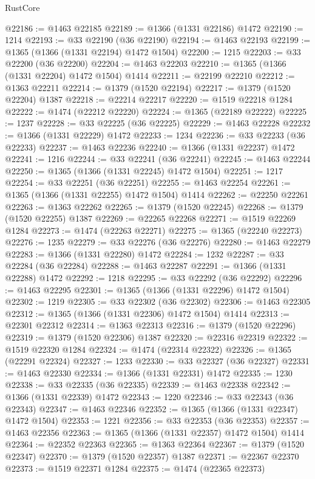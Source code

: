 \begin{lexlean}{RustCore}
\begin{coremodule}
@22186 := @1463 @22185
@22189 := @1366 (@1331 @22186) @1472
@22190 := 1214
@22193 := @33 @22190 (@36 @22190)
@22194 := @1463 @22193
@22199 := @1365 (@1366 (@1331 @22194) @1472 @1504)
@22200 := 1215
@22203 := @33 @22200 (@36 @22200)
@22204 := @1463 @22203
@22210 := @1365 (@1366 (@1331 @22204) @1472 @1504) @1414
@22211 := @22199 @22210
@22212 := @1363 @22211
@22214 := @1379 (@1520 @22194)
@22217 := @1379 (@1520 @22204) @1387
@22218 := @22214 @22217
@22220 := @1519 @22218 @1284
@22222 := @1474 (@22212 @22220)
@22224 := @1365 (@22189 @22222)
@22225 := 1237
@22228 := @33 @22225 (@36 @22225)
@22229 := @1463 @22228
@22232 := @1366 (@1331 @22229) @1472
@22233 := 1234
@22236 := @33 @22233 (@36 @22233)
@22237 := @1463 @22236
@22240 := @1366 (@1331 @22237) @1472
@22241 := 1216
@22244 := @33 @22241 (@36 @22241)
@22245 := @1463 @22244
@22250 := @1365 (@1366 (@1331 @22245) @1472 @1504)
@22251 := 1217
@22254 := @33 @22251 (@36 @22251)
@22255 := @1463 @22254
@22261 := @1365 (@1366 (@1331 @22255) @1472 @1504) @1414
@22262 := @22250 @22261
@22263 := @1363 @22262
@22265 := @1379 (@1520 @22245)
@22268 := @1379 (@1520 @22255) @1387
@22269 := @22265 @22268
@22271 := @1519 @22269 @1284
@22273 := @1474 (@22263 @22271)
@22275 := @1365 (@22240 @22273)
@22276 := 1235
@22279 := @33 @22276 (@36 @22276)
@22280 := @1463 @22279
@22283 := @1366 (@1331 @22280) @1472
@22284 := 1232
@22287 := @33 @22284 (@36 @22284)
@22288 := @1463 @22287
@22291 := @1366 (@1331 @22288) @1472
@22292 := 1218
@22295 := @33 @22292 (@36 @22292)
@22296 := @1463 @22295
@22301 := @1365 (@1366 (@1331 @22296) @1472 @1504)
@22302 := 1219
@22305 := @33 @22302 (@36 @22302)
@22306 := @1463 @22305
@22312 := @1365 (@1366 (@1331 @22306) @1472 @1504) @1414
@22313 := @22301 @22312
@22314 := @1363 @22313
@22316 := @1379 (@1520 @22296)
@22319 := @1379 (@1520 @22306) @1387
@22320 := @22316 @22319
@22322 := @1519 @22320 @1284
@22324 := @1474 (@22314 @22322)
@22326 := @1365 (@22291 @22324)
@22327 := 1233
@22330 := @33 @22327 (@36 @22327)
@22331 := @1463 @22330
@22334 := @1366 (@1331 @22331) @1472
@22335 := 1230
@22338 := @33 @22335 (@36 @22335)
@22339 := @1463 @22338
@22342 := @1366 (@1331 @22339) @1472
@22343 := 1220
@22346 := @33 @22343 (@36 @22343)
@22347 := @1463 @22346
@22352 := @1365 (@1366 (@1331 @22347) @1472 @1504)
@22353 := 1221
@22356 := @33 @22353 (@36 @22353)
@22357 := @1463 @22356
@22363 := @1365 (@1366 (@1331 @22357) @1472 @1504) @1414
@22364 := @22352 @22363
@22365 := @1363 @22364
@22367 := @1379 (@1520 @22347)
@22370 := @1379 (@1520 @22357) @1387
@22371 := @22367 @22370
@22373 := @1519 @22371 @1284
@22375 := @1474 (@22365 @22373)

\end{coremodule}
\end{lexlean}
